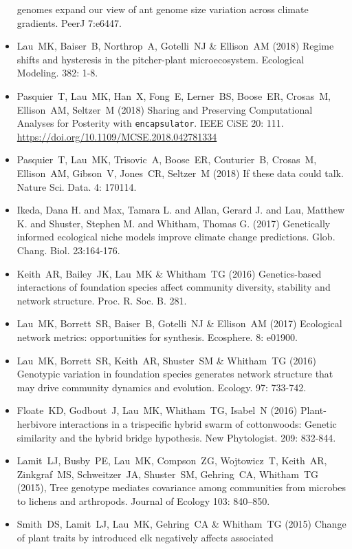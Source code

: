 \documentclass[a4paper]{article}
\begin{document}
\begin{itemize}
  genomes expand our view of ant genome size variation across climate
  gradients. PeerJ 7:e6447. 
\item  Lau~MK, Baiser~B, Northrop~A, Gotelli~NJ \& Ellison~AM (2018) Regime
  shifts and hysteresis in the pitcher-plant
  microecosystem. Ecological Modeling. 382: 1-8.
\item Pasquier~T, Lau~MK, Han~X, Fong~E, Lerner~BS, Boose~ER, Crosas~M,
  Ellison~AM, Seltzer~M (2018) Sharing and Preserving Computational
  Analyses for Posterity with \texttt{encapsulator}. IEEE CiSE 20:
  111. \href{https://doi.org/10.1109/MCSE.2018.042781334}{https://doi.org/10.1109/MCSE.2018.042781334}
\item 
  Pasquier~T, Lau~MK, Trisovic~A, Boose~ER, Couturier~B, Crosas~M,
  Ellison~AM, Gibson~V, Jones~CR, Seltzer~M (2018) If these data could
  talk. Nature Sci. Data. 4: 170114.
\item  
  Ikeda, Dana H. and Max, Tamara L. and Allan, Gerard J. and Lau,
  Matthew K. and Shuster, Stephen M. and Whitham, Thomas G. (2017)
  Genetically informed ecological niche models improve climate change
  predictions. Glob. Chang. Biol. 23:164-176.
\item 
  Keith~AR, Bailey~JK, Lau~MK \& Whitham~TG (2016) Genetics-based
  interactions of foundation species affect community diversity,
  stability and network structure. Proc. R. Soc. B. 281.
\item  
  Lau~MK, Borrett~SR, Baiser~B, Gotelli~NJ \& Ellison~AM (2017)
  Ecological network metrics: opportunities for
  synthesis. Ecosphere. 8: e01900.
\item
  Lau~MK, Borrett~SR, Keith~AR, Shuster~SM \& Whitham~TG (2016)
  Genotypic variation in foundation species generates network
  structure that may drive community dynamics and
  evolution. Ecology. 97: 733-742.
\item
  Floate~KD, Godbout~J, Lau~MK, Whitham~TG, Isabel~N (2016)
  Plant-herbivore interactions in a trispecific hybrid swarm of
  cottonwoods: Genetic similarity and the hybrid bridge
  hypothesis. New Phytologist. 209: 832-844.
\item 
  Lamit~LJ, Busby~PE, Lau~MK, Compson~ZG, Wojtowicz~T, Keith~AR,
  Zinkgraf~MS, Schweitzer~JA, Shuster~SM, Gehring~CA, Whitham~TG
  (2015), Tree genotype mediates covariance among communities from
  microbes to lichens and arthropods. Journal of Ecology 103: 840–850.
\item
  Smith~DS, Lamit~LJ, Lau~MK, Gehring~CA \& Whitham~TG (2015) Change
  of plant traits by introduced elk negatively affects associated

\end{itemize}
\end{document}
